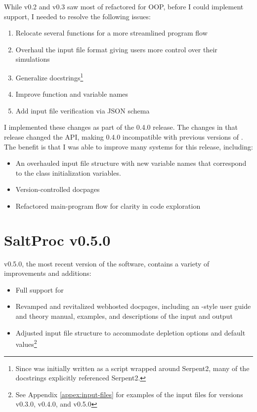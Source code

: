 While v0.2 and v0.3 saw most of \SaltProc refactored for OOP, before I could
implement \OpenMC support, I needed to resolve the following issues:
\begin{enumerate}
    \item Relocate several functions for a more streamlined program flow
    \item Overhaul the \SaltProc input file format giving users more control over their simulations
    \item Generalize docstrings\footnote{Since \SaltProc was initially written as a script wrapped around Serpent2, many of the docstrings explicitly referenced Serpent2.}
    \item Improve function and variable names
    \item Add input file verification via JSON schema
\end{enumerate}
I implemented these changes as part of the 0.4.0 release. The changes in that
release changed the API, making 0.4.0 incompatible with previous versions of
\SaltProc. The benefit is that I was able to improve many systems for this
release, including:
\begin{itemize}
    \item An overhauled input file structure with new variable names that
    correspond to the class initialization variables.
    \item Version-controlled docpages
    \item Refactored main-program flow for clarity in code exploration
\end{itemize}

\section{SaltProc v0.5.0}
\label{sec:saltproc-detail}

\SaltProc v0.5.0, the most recent version of the software, contains a variety of
improvements and additions:
\begin{itemize}
    \item Full support for \OpenMC
    \item Revamped and revitalized webhosted docpages, including an
    \OpenMC-style user guide and theory manual, examples, and descriptions of
    the input and output 
    \item Adjusted input file structure to accommodate \OpenMC depletion 
    options and default values\footnote{See Appendix \ref{appex:input-files}
    for examples of the input files for versions v0.3.0, v0.4.0, and v0.5.0}
\end{itemize}

